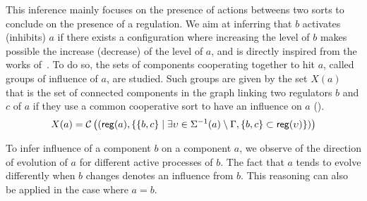 This inference mainly focuses on the presence of actions betweens two sorts to conclude on the presence of a regulation.
We aim at inferring that $b$ activates (inhibits) $a$ if there exists a configuration where increasing
the level of $b$ makes possible the increase (decrease) of the level of $a$,
and is directly inspired from the works of~\cite{Richard2010378}.
To do so, the sets of components cooperating together to hit $a$, called groups of influence of $a$, are studied.
Such groups are given by the set $X(a)$ that is the set of connected components in the graph linking two regulators
$b$ and $c$ of $a$ if they use a common cooperative sort to have an influence on $a$ ().
\begin{equation}
X(a) = \mathcal C\left( (\mathsf{reg}({a}), \{ \{b,c\} \mid
        \exists \upsilon\in \Sigma^{-1}(a) \setminus \Gamma,
        \{b,c\} \subset \mathsf{reg}({\upsilon}) \}) \right)
\label{eq:influence-groups}
\end{equation}

To infer influence of a component $b$ on a component $a$,
we observe of the direction of evolution of $a$ for different active processes of $b$.
The fact that $a$ tends to evolve differently when $b$ changes denotes an influence from $b$.
This reasoning can also be applied in the case where $a = b$.


